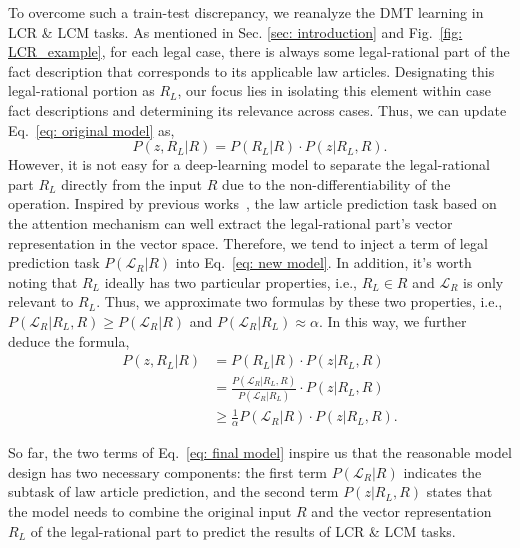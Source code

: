 To overcome such a train-test discrepancy, we reanalyze the DMT learning in LCR \& LCM tasks. 
As mentioned in Sec. \ref{sec: introduction} and Fig.~\ref{fig: LCR_example}, for each legal case, there is always some legal-rational part of the fact description that corresponds to its applicable law articles. 
Designating this legal-rational portion as $R_L$, our focus lies in isolating this element within case fact descriptions and determining its relevance across cases.
Thus, we can update Eq.~\ref{eq: original model} as,
\begin{equation} \label{eq: new model}
P(z, R_L|R) = P(R_L|R) \cdot P(z|R_L, R).  
\end{equation}
However, it is not easy for a deep-learning model to separate the legal-rational part $R_L$ directly from the input $R$ due to the non-differentiability of the operation.
Inspired by previous works~\cite{xu2020LADAN, luo2017FLA}, the law article prediction task based on the attention mechanism can well extract the legal-rational part's vector representation in the vector space. 
Therefore, we tend to inject a term of legal prediction task $P(\mathcal{L}_R|R)$ into Eq.~\ref{eq: new model}.
In addition, it's worth noting that $R_L$ ideally has two particular properties, i.e., $R_L \in R$ and $\mathcal{L}_R$ is only relevant to $R_L$. 
Thus, we approximate two formulas by these two properties, i.e., $ P(\mathcal{L}_R| R_L, R) \geq P(\mathcal{L}_R|R) $ and $ P(\mathcal{L}_R|R_L) \approx \alpha$. 
In this way, we further deduce the formula,
\begin{equation} \label{eq: final model}
\begin{aligned}
P(z, R_L|R) &= P(R_L|R) \cdot P(z|R_L, R)\\
&=\frac{P(\mathcal{L}_R|R_L, R)}{P(\mathcal{L}_R|R_L)} \cdot P(z|R_L, R)\\
&\geq \frac{1}{\alpha} P(\mathcal{L}_R|R) \cdot P(z|R_L, R).
\end{aligned}
\end{equation}

So far, the two terms of Eq.~\ref{eq: final model} inspire us that the reasonable model design has two necessary components: the first term $P(\mathcal{L}_R|R)$ indicates the subtask of law article prediction, and the second term $P(z|R_L, R)$ states that the model needs to combine the original input $R$ and the vector representation $R_L$ of the legal-rational part to predict the results of LCR \& LCM tasks.

